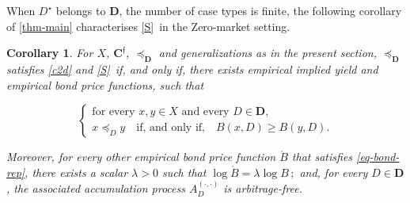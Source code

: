 \documentclass[ecta,nameyear,draft]{econsocart}
\newcommand{\novel}{\mathfrak f}
\newcommand{\mbbd}{{\mathbf D}}
\newcommand{\mbbcp}{{\mathbf C^{\novel}}}
\newcommand{\dd}{{(\cdot,\cdot)}}
\newcommand{\stability}{\ref{S}}
\theoremstyle{plain}
\newtheorem{corollary}{Corollary}[theorem]
\theoremstyle{remark}
\begin{document}
When $D^{\star}$ belongs to $\mbbd$, the number of case types is finite, the
following corollary of \cref{thm-main} characterises \stability\ in the
Zero-market setting.
\begin{corollary}\label{cor-bond-rep} For $X$, $\mbbcp$, $\preceq_\mbbd$ and
  generalizations as in the present section, $\preceq_{\mbbd}$ satisfies
  \ref{c2d} and \stability\ if, and only if, there exists empirical implied
  yield and empirical bond price functions, such that
  \begin{linenomath*} 
    \begin{equation}\tag{$*$}\label{eq-bond-rep} \left\{
        \begin{array}{l}
          \text{for every $x , y \in X$ and every $D \in \mbbd$,}\\
          x \preceq_{D} y \quad \text{if, and only if,}\quad B(x,D) \geq B(y,D).
      \end{array}\right.
    \end{equation}
  \end{linenomath*} 
  Moreover, for every other empirical bond price function $\acute{B}$ that
  satisfies \eqref{eq-bond-rep}, there exists a scalar $\lambda > 0$ such that
  $\log \acute{B} = \lambda \log B\,;$ and, for every $D\in \mbbd$, the
  associated accumulation process ${A}^{\dd}_{D}$ is arbitrage-free.
\end{corollary}
\end{document}

